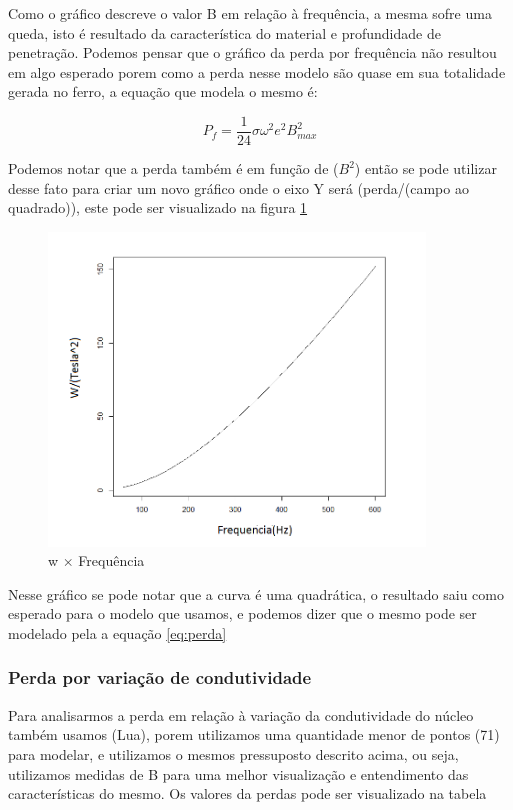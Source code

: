 \documentclass[
	12pt,				%
	openright,			%
	twoside,			%
	a4paper,			%
	english,			%
	french,				%
	spanish,			%
	brazil,				%
	]{abntex2}
\begin{document}
Como o gráfico descreve o valor B em relação à frequência, a mesma sofre uma queda, isto é resultado da característica do material e profundidade de penetração.
Podemos pensar que o gráfico da perda por frequência não resultou em algo esperado porem como a perda nesse modelo são quase em sua totalidade gerada no ferro, a equação que modela o mesmo é:

\begin{equation} \label{eq:perda}
  P_{f} = \frac{1}{24} \sigma \omega^2e^2B_{max}^2
\end{equation} 


Podemos notar que a perda também é em função de ($B^2$) então se pode utilizar desse fato para criar um novo gráfico onde o eixo Y será (perda/(campo ao quadrado)), este pode ser visualizado na figura \ref{fig:gra_w_f}

\begin{figure}[H]
    \centering
    \includegraphics[width=10cm]{img/w_frequencia.png}
    \caption{w $\times$ Frequência }
    \label{fig:gra_w_f}
\end{figure}

Nesse gráfico se pode notar que a curva é uma quadrática, o resultado saiu como esperado para o modelo que usamos, e podemos dizer que o mesmo pode ser modelado pela a equação \ref{eq:perda}

\subsubsection{Perda por variação de condutividade}

Para analisarmos a perda em relação à variação da condutividade do núcleo também usamos (Lua), porem utilizamos uma quantidade menor de pontos (71) para modelar, e utilizamos o mesmos pressuposto descrito acima, ou seja, utilizamos medidas de B para uma melhor visualização  e entendimento das características do mesmo. 
Os valores da perdas pode ser visualizado na tabela \label{tab:p_f_vi}
\end{document}

